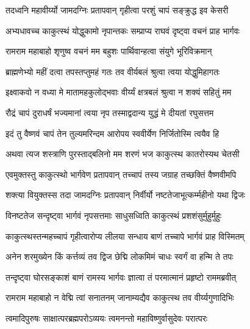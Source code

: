\twolineshloka
{तदध्वनि महावीर्य्यो जामदग्निः प्रतापवान्}
{गृहीत्वा परशुं चापं सङ्क्रुद्ध इव केसरी}%

\twolineshloka
{अभ्यधावच्च काकुत्स्थं योद्धुकामो नृपान्तकः}
{सम्प्राप्य राघवं दृष्ट्वा वचनं प्राह भार्गवः}%


\twolineshloka
{रामराम महाबाहो शृणुष्व वचनं मम}
{बहुशः पार्थिवान्हत्वा संयुगे भूरिविक्रमान्}%

\twolineshloka
{ब्राह्मणेभ्यो महीं दत्वा तपस्तप्तुमहं गतः}
{तव वीर्यबलं श्रुत्वा त्वया योद्धुमिहागतः}%

\twolineshloka
{इक्ष्वाकवो न वध्या मे मातामहकुलोद्भवाः}
{वीर्य्यं क्षत्रबलं श्रुत्वा न शक्यं सहितुं मम}%

\twolineshloka
{रौद्रं चापं दुराधर्षं भज्यमानां त्वया नृप}
{तस्माद्वदान्य युद्धं मे दीयतां रघुसत्तम}%

\twolineshloka
{इदं तु वैष्णवं चापं तेन तुल्यमरिन्दम}
{आरोपय स्ववीर्येण निर्जितोस्मि त्वयैव हि}%

\twolineshloka
{अथवा त्यज शस्त्राणि पुरस्ताद्बलिनो मम}
{शरणं भज काकुत्स्थ कातरोस्यथ चेतसी}%


\twolineshloka
{एवमुक्तस्तु काकुत्स्थो भार्गवेण प्रतापवान्}
{तच्चापं तस्य जग्राह तच्छक्तिं वैष्णवीमपि}%

\twolineshloka
{शक्त्या वियुक्तस्स तदा जामदग्निः प्रतापवान्}
{निर्वीर्यो नष्टतेजाभूत्कर्म्महीनो यथा द्विजः}%

\twolineshloka
{विनष्टतेज सन्दृष्ट्वा भार्गवं नृपसत्तमाः}
{साधुसध्विति काकुत्स्थं प्रशशंसुर्मुहुर्मुहुः}%

\twolineshloka
{काकुत्स्थस्तन्महच्चापं गृहीत्वारोप्य लीलया}
{सन्धाय बाणं तच्चापे भार्गवं प्राह विस्मितम्}%


\twolineshloka
{अनेन शरमुख्येन किं कर्त्तव्यं तव द्विज}
{छेद्मि लोकमिमं चाधः स्वर्गं वा हन्मि ते तपः}%


\twolineshloka
{तन्दृष्ट्वा घोरसङ्काशं बाणं रामस्य भार्गवः}
{ज्ञात्वा तं परमात्मानं प्रहृष्टो राममब्रवीत्}%


\twolineshloka
{रामराम महाबाहो न वेद्मि त्वां सनातनम्}
{जानाम्यद्यैव काकुत्स्थ तव वीर्य्यगुणादिभिः}%

\twolineshloka
{त्वमादिपुरुषः साक्षात्परब्रह्मपरोऽव्ययः}
{त्वमनन्तो महाविष्णुर्वासुदेवः परात्परः}%

